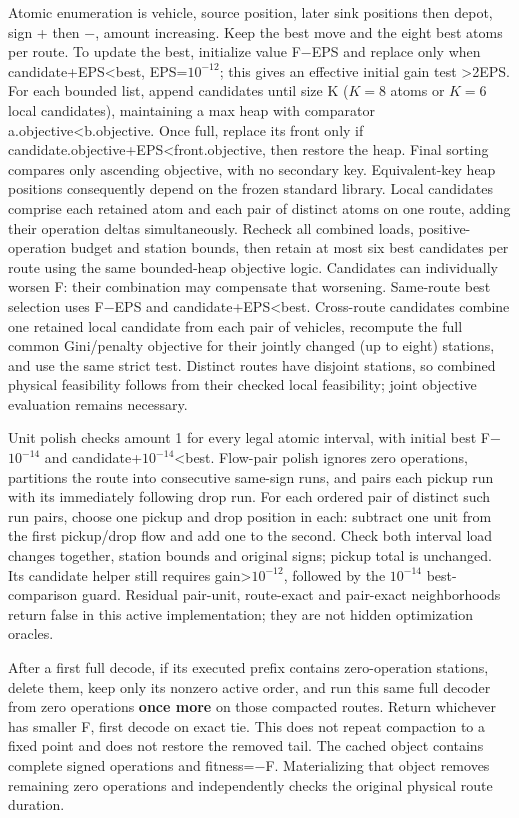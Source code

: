 \documentclass[
  american,
  11pt,
]{article}
\begin{document}
Atomic enumeration is vehicle, source position, later sink positions
then depot, sign + then −, amount increasing. Keep the best move and the
eight best atoms per route. To update the best, initialize value F−EPS
and replace only when candidate+EPS\textless best, EPS=\(10^{-12}\);
this gives an effective initial gain test \textgreater2EPS. For each
bounded list, append candidates until size K (\(K=8\) atoms or \(K=6\)
local candidates), maintaining a max heap with comparator
a.objective\textless b.objective. Once full, replace its front only if
candidate.objective+EPS\textless front.objective, then restore the heap.
Final sorting compares only ascending objective, with no secondary key.
Equivalent-key heap positions consequently depend on the frozen standard
library. Local candidates comprise each retained atom and each pair of
distinct atoms on one route, adding their operation deltas
simultaneously. Recheck all combined loads, positive-operation budget
and station bounds, then retain at most six best candidates per route
using the same bounded-heap objective logic. Candidates can individually
worsen F: their combination may compensate that worsening. Same-route
best selection uses F−EPS and candidate+EPS\textless best. Cross-route
candidates combine one retained local candidate from each pair of
vehicles, recompute the full common Gini/penalty objective for their
jointly changed (up to eight) stations, and use the same strict test.
Distinct routes have disjoint stations, so combined physical feasibility
follows from their checked local feasibility; joint objective evaluation
remains necessary.

Unit polish checks amount 1 for every legal atomic interval, with
initial best F−\(10^{-14}\) and candidate+\(10^{-14}\)\textless best.
Flow-pair polish ignores zero operations, partitions the route into
consecutive same-sign runs, and pairs each pickup run with its
immediately following drop run. For each ordered pair of distinct such
run pairs, choose one pickup and drop position in each: subtract one
unit from the first pickup/drop flow and add one to the second. Check
both interval load changes together, station bounds and original signs;
pickup total is unchanged. Its candidate helper still requires
gain\textgreater{}\(10^{-12}\), followed by the \(10^{-14}\)
best-comparison guard. Residual pair-unit, route-exact and pair-exact
neighborhoods return false in this active implementation; they are not
hidden optimization oracles.

After a first full decode, if its executed prefix contains
zero-operation stations, delete them, keep only its nonzero active
order, and run this same full decoder from zero operations \textbf{once
more} on those compacted routes. Return whichever has smaller F, first
decode on exact tie. This does not repeat compaction to a fixed point
and does not restore the removed tail. The cached object contains
complete signed operations and fitness=−F. Materializing that object
removes remaining zero operations and independently checks the original
physical route duration.
\end{document}
